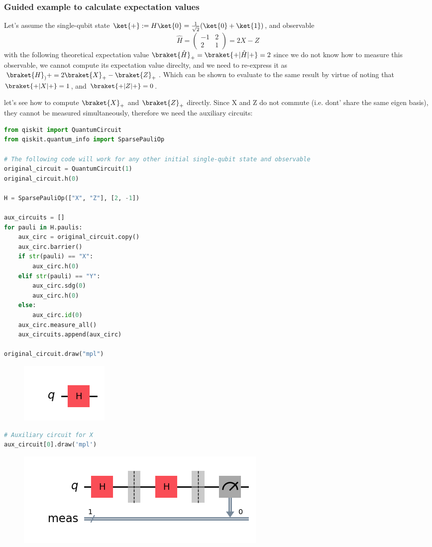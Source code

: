 \documentclass[12pt, oneside]{book}
\theoremstyle{definition}
\theoremstyle{definition}
\theoremstyle{remark}
\begin{document}
\subsubsection{Guided example to calculate expectation values}
Let's assume the single-qubit state $\ket{+}:=H\ket{0}=\frac{1}{\sqrt{2}}(\ket{0}+\ket{1})$, and observable
\[
\hat{H}=\begin{pmatrix} -1 & 2 \\ 2 & 1 \end{pmatrix}=2X-Z
\]
with the following theoretical expectation value $\braket{\hat{H}}_{+}=\braket{+|\hat{H}|+}=2$
since we do not know how to measure this observable, we cannot compute its expectation value direclty, and we need to re-express it as $\braket{H}_){+}=2\braket{X}_{+}-\braket{Z}_{+}$. Which can be shown to evaluate to the same result by virtue of noting that $\braket{+|X|+}=1$, and $\braket{+|Z|+}=0$.

let's see how to compute $\braket{X}_+$ and $\braket{Z}_+$ directly. Since X and Z do not commute (i.e. dont' share the same eigen basis), they cannot be measured simultaneously, therefore we need the auxiliary circuits:
\begin{lstlisting}[language=Python]
from qiskit import QuantumCircuit
from qiskit.quantum_info import SparsePauliOp

# The following code will work for any other initial single-qubit state and observable
original_circuit = QuantumCircuit(1)
original_circuit.h(0)

H = SparsePauliOp(["X", "Z"], [2, -1])

aux_circuits = []
for pauli in H.paulis:
    aux_circ = original_circuit.copy()
    aux_circ.barrier()
    if str(pauli) == "X":
        aux_circ.h(0)
    elif str(pauli) == "Y":
        aux_circ.sdg(0)
        aux_circ.h(0)
    else:
        aux_circ.id(0)
    aux_circ.measure_all()
    aux_circuits.append(aux_circ)

original_circuit.draw("mpl")
\end{lstlisting}
\begin{figure}[H]
    \centering
    \includegraphics[width=0.25\linewidth]{../images/QH1.png}
\end{figure}

\begin{lstlisting}[language=Python]
# Auxiliary circuit for X
aux_circuit[0].draw('mpl')
\end{lstlisting}
\begin{figure}[H]
    \centering
    \includegraphics[width=0.5\linewidth]{../images/aux_circ_cost.png}
\end{figure}
\end{document}
